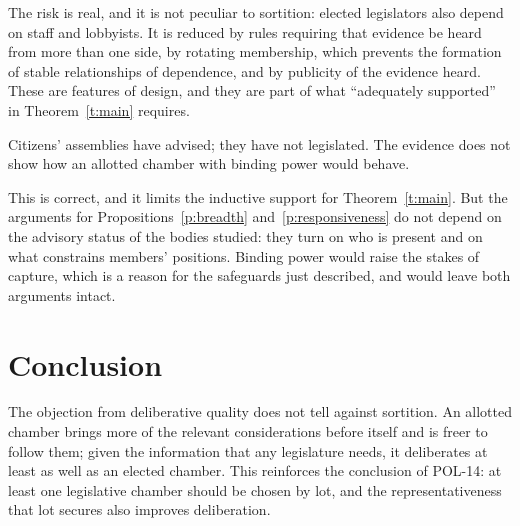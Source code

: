 \documentclass{situationist-preprint}
\begin{document}
\begin{reply}
The risk is real, and it is not peculiar to sortition: elected legislators also depend on staff and lobbyists. It is reduced by rules requiring that evidence be heard from more than one side, by rotating membership, which prevents the formation of stable relationships of dependence, and by publicity of the evidence heard. These are features of design, and they are part of what \enquote{adequately supported} in Theorem~\ref{t:main} requires.
\end{reply}

\begin{objection}
Citizens' assemblies have advised; they have not legislated. The evidence does not show how an allotted chamber with binding power would behave.
\end{objection}

\begin{reply}
This is correct, and it limits the inductive support for Theorem~\ref{t:main}. But the arguments for Propositions~\ref{p:breadth} and~\ref{p:responsiveness} do not depend on the advisory status of the bodies studied: they turn on who is present and on what constrains members' positions. Binding power would raise the stakes of capture, which is a reason for the safeguards just described, and would leave both arguments intact.
\end{reply}

\section{Conclusion}

The objection from deliberative quality does not tell against sortition. An allotted chamber brings more of the relevant considerations before itself and is freer to follow them; given the information that any legislature needs, it deliberates at least as well as an elected chamber. This reinforces the conclusion of POL-14: at least one legislative chamber should be chosen by lot, and the representativeness that lot secures also improves deliberation.
\end{document}
